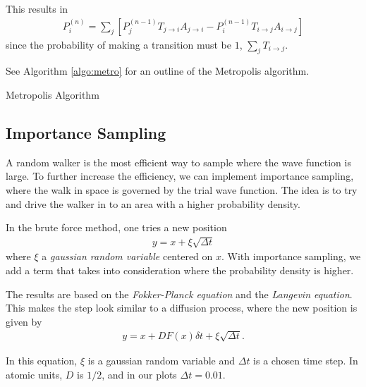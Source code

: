 \documentclass[twocolumns, a4paper,10pt,fleqn]{extarticle}
\newcommand{\eq}[1]{{\small\begin{align*}#1\end{align*}}}
\begin{document}
This results in
\eq{
  P_{i}^{(n)} = 
  \sum_j \left[
  P_{j}^{(n-1)} T_{j\rightarrow i} A_{j\rightarrow i}-
  P_{i}^{(n-1)} T_{i\rightarrow j} A_{i\rightarrow j}
  \right]
}
since the probability of making a transition must be $1$, $\sum_j T_{i\rightarrow j}$.


See Algorithm \ref{algo:metro} for an outline of the Metropolis algorithm.

\begin{algorithm}[H]
	\caption{Metropolis Algorithm}\label{algo:metro}
  \begin{algorithmic}[1]
    \EndProcedure
  \end{algorithmic}
\end{algorithm}

\subsection{Importance Sampling}
A random walker is the most efficient way to sample where the
wave function is large. To further increase the efficiency, we can implement importance
sampling, where the walk in space is governed by the trial wave function.
The idea is to try and drive the walker in to an area with a higher probability
density.

In the brute force method, one tries a new position
\eq{
  y = x + \xi \sqrt{\Delta t}
}
where $\xi$ a \textit{gaussian random variable} centered on $x$.
With importance sampling, we add a term that takes into consideration
where the probability density is higher.

The results are based on the 
\textit{Fokker-Planck equation} and the \textit{Langevin 
equation}. This makes the step look similar to a diffusion process,
where the new position is given by
\begin{align*}
y = x + DF(x) \delta t + \xi \sqrt{\Delta t}.
\end{align*}

In this equation, $\xi $ is a gaussian random variable 
and $\Delta t$ is a chosen time step.
In atomic units, $D$ is $1/2$, and in our plots $\Delta t = 0.01$. 
\end{document}
